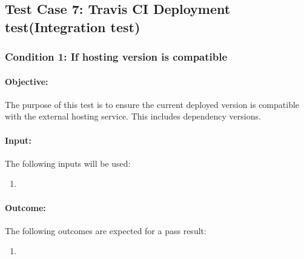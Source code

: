 \documentclass{article}
\begin{document}
\subsection{Test Case 7: Travis CI Deployment test(Integration test)}\label{test7}
\subsubsection{Condition 1: If hosting version is compatible}
\paragraph{Objective:} The purpose of this test is to ensure the current deployed version is compatible with the external hosting service. This includes dependency versions.
\paragraph{Input:} The following inputs will be used:
\begin{enumerate}
	\item 
\end{enumerate}
\paragraph{Outcome:} The following outcomes are expected for a pass result:
\begin{enumerate}
	\item 
\end{enumerate}
\end{document}
